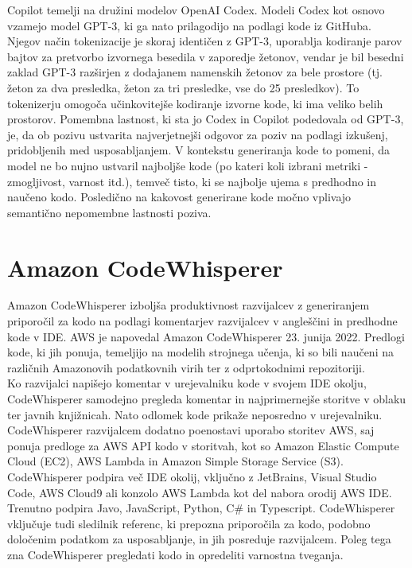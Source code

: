 \documentclass[a4paper,12pt,openright]{book}
\begin{document}
Copilot temelji na družini modelov OpenAI Codex. Modeli Codex kot osnovo vzamejo model GPT-3, ki ga nato prilagodijo na podlagi kode iz GitHuba. Njegov način tokenizacije je skoraj identičen z GPT-3, uporablja kodiranje parov bajtov za pretvorbo izvornega besedila v zaporedje žetonov, vendar je bil besedni zaklad GPT-3 razširjen z dodajanem namenskih žetonov za bele prostore (tj. žeton za dva presledka, žeton za tri presledke, vse do 25 presledkov). To tokenizerju omogoča učinkovitejše kodiranje izvorne kode, ki ima veliko belih prostorov. Pomembna lastnost, ki sta jo Codex in Copilot podedovala od GPT-3, je, da ob pozivu ustvarita najverjetnejši odgovor za poziv na podlagi izkušenj, pridobljenih med usposabljanjem. V kontekstu generiranja kode to pomeni, da model ne bo nujno ustvaril najboljše kode (po kateri koli izbrani metriki - zmogljivost, varnost itd.), temveč tisto, ki se najbolje ujema s predhodno in naučeno kodo. Posledično na kakovost generirane kode močno vplivajo semantično nepomembne lastnosti poziva. \cite{9833571, 10.1145/3520312.3534862}



\section{Amazon CodeWhisperer}
Amazon CodeWhisperer izboljša produktivnost razvijalcev z generiranjem priporočil za kodo na podlagi komentarjev razvijalcev v angleščini in predhodne kode v IDE. AWS je napovedal Amazon CodeWhisperer 23. junija 2022.
Predlogi kode, ki jih ponuja, temeljijo na modelih strojnega učenja, ki so bili naučeni na različnih Amazonovih podatkovnih virih ter z odprtokodnimi repozitoriji.\cite{aws_developer} \\
Ko razvijalci napišejo komentar v urejevalniku kode v svojem IDE okolju, CodeWhisperer samodejno pregleda komentar in najprimernejše storitve v oblaku ter javnih knjižnicah. Nato odlomek kode prikaže neposredno v urejevalniku. CodeWhisperer razvijalcem dodatno poenostavi uporabo storitev AWS, saj ponuja predloge za AWS API kodo v storitvah, kot so Amazon Elastic Compute Cloud (EC2), AWS Lambda in Amazon Simple Storage Service (S3). CodeWhisperer podpira več IDE okolij, vključno z JetBrains, Visual Studio Code, AWS Cloud9 ali konzolo AWS Lambda kot del nabora orodij AWS IDE. Trenutno podpira Javo, JavaScript, Python, C\# in Typescript. CodeWhisperer vključuje tudi sledilnik referenc, ki prepozna priporočila za kodo, podobno določenim podatkom za usposabljanje, in jih posreduje razvijalcem. Poleg tega zna CodeWhisperer pregledati kodo in opredeliti varnostna tveganja. \cite{saasworthy_codewhisperer}
\pagebreak
\end{document}
